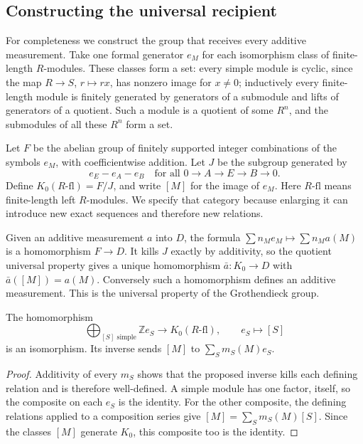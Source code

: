 \subsection{Constructing the universal recipient}

For completeness we construct the group that receives every additive
measurement. Take one formal generator $e_M$ for each isomorphism
class of finite-length $R$-modules. These classes form a set: every
simple module is cyclic, since the map $R\to S$, $r\mapsto rx$, has
nonzero image for $x\ne0$; inductively every finite-length module is
finitely generated by generators of a submodule and lifts of generators
of a quotient. Such a module is a quotient of some $R^n$, and the
submodules of all these $R^n$ form a set.

Let $F$ be the abelian group of finitely supported integer combinations
of the symbols $e_M$, with coefficientwise addition. Let $J$ be the
subgroup generated by
\[
 e_E-e_A-e_B
 \quad\text{for all }0\to A\to E\to B\to0.
\]
Define $K_0(R\text{-}\mathrm{fl})=F/J$, and write $[M]$ for the
image of $e_M$. Here $R\text{-}\mathrm{fl}$ means finite-length
left $R$-modules. We specify that category because enlarging it can
introduce new exact sequences and therefore new relations.

Given an additive measurement $a$ into $D$, the formula
$\sum n_Me_M\mapsto\sum n_Ma(M)$ is a homomorphism $F\to D$.
It kills $J$ exactly by additivity, so the quotient universal property
gives a unique homomorphism $\bar a:K_0\to D$ with $\bar a([M])=a(M)$.
Conversely such a homomorphism defines an additive measurement.
This is the universal property of the Grothendieck group.

\begin{theorem}\label{k:free-simples}
The homomorphism
\[
 \bigoplus_{[S]\text{ simple}}\mathbb Z e_S\longrightarrow
 K_0(R\text{-}\mathrm{fl}),\qquad e_S\longmapsto[S]
\]
is an isomorphism. Its inverse sends $[M]$ to
$\sum_Sm_S(M)e_S$.
\end{theorem}
\begin{proof}
Additivity of every $m_S$ shows that the proposed inverse kills each
defining relation and is therefore well-defined. A simple module has
one factor, itself, so the composite on each $e_S$ is the identity.
For the other composite, the defining relations applied to a composition
series give $[M]=\sum_Sm_S(M)[S]$. Since the classes $[M]$ generate
$K_0$, this composite too is the identity.
\end{proof}


